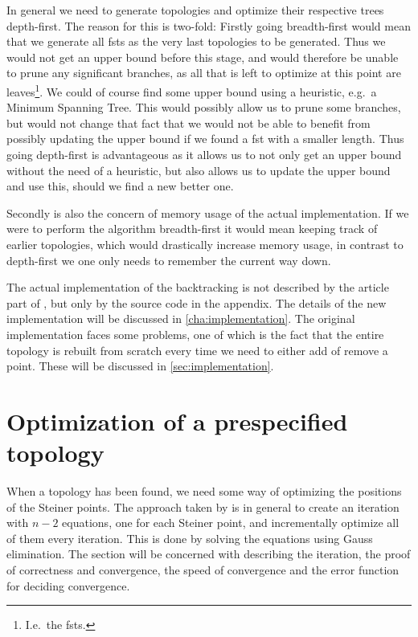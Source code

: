 In general we need to generate topologies and optimize their respective trees
depth-first. The reason for this is two-fold: Firstly going breadth-first would
mean that we generate all \acp{fst} as the very last topologies to be
generated. Thus we would not get an upper bound before this stage, and would
therefore be unable to prune any significant branches, as all that is left to
optimize at this point are leaves\footnote{I.e.\ the \acp{fst}.}. We could of
course find some upper bound using a heuristic, e.g.\ a Minimum Spanning
Tree. This would possibly allow us to prune some branches, but would not change
that fact that we would not be able to benefit from possibly updating the upper
bound if we found a \ac{fst} with a smaller length. Thus going depth-first is
advantageous as it allows us to not only get an upper bound without the need of
a heuristic, but also allows us to update the upper bound and use this, should
we find a new better one.

Secondly is also the concern of memory usage of the actual implementation. If we
were to perform the algorithm breadth-first it would mean keeping track of
earlier topologies, which would drastically increase memory usage, in contrast
to depth-first we one only needs to remember the current way down.

The actual implementation of the backtracking is not described by the article
part of \textcite{smith1992}, but only by the source code in the appendix. The
details of the new implementation will be discussed in
\cref{cha:implementation}. The original implementation faces some problems,
one of which is the fact that the entire topology is rebuilt from scratch every
time we need to either add of remove a point. These will be discussed in
\cref{sec:implementation}.

\section{Optimization of a prespecified topology}
\label{sec:optim-presp-topol}

When a topology has been found, we need some way of optimizing the positions of the
Steiner points. The approach taken by \citeauthor{smith1992} is in general to create an
iteration with $n-2$ equations, one for each Steiner point, and incrementally
optimize all of them every iteration. This is done by solving the equations
using Gauss elimination. The section will be concerned with describing the
iteration, the proof of correctness and convergence, the speed of convergence
and the error function for deciding convergence.

